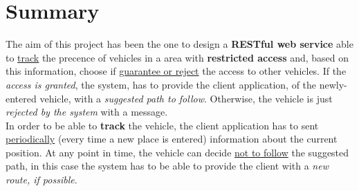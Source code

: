 \chapter{Summary}\label{Chap:Summary}
The aim of this project has been the one to design a \textbf{RESTful web service} able to \underline{track} the precence of vehicles in a area with \textbf{restricted access} and, based on this information, choose if \underline{guarantee or reject} the access to other vehicles. If the \textit{access is granted}, the system, has to provide the client application, of the newly-entered vehicle, with a \textit{suggested path to follow}. Otherwise, the vehicle is just \textit{rejected by the system} with a message.\\
In order to be able to \textbf{track} the vehicle, the client application has to sent \underline{periodically} (every time a new place is entered) information about the current position. At any point in time, the vehicle can decide \underline{not to follow} the suggested path, in this case the system has to be able to provide the client with a \textit{new route, if possible}.\\
